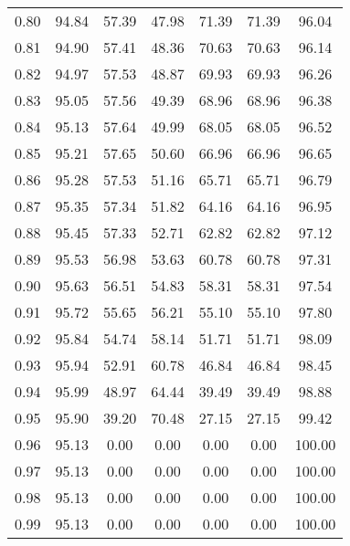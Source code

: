 \begin{tabular}{|c|c|c|c|c|c|c|}
      0.80 &     94.84 &     57.39 &      47.98 &   71.39 &      71.39 &         96.04 \\
      0.81 &     94.90 &     57.41 &      48.36 &   70.63 &      70.63 &         96.14 \\
      0.82 &     94.97 &     57.53 &      48.87 &   69.93 &      69.93 &         96.26 \\
      0.83 &     95.05 &     57.56 &      49.39 &   68.96 &      68.96 &         96.38 \\
      0.84 &     95.13 &     57.64 &      49.99 &   68.05 &      68.05 &         96.52 \\
      0.85 &     95.21 &     57.65 &      50.60 &   66.96 &      66.96 &         96.65 \\
      0.86 &     95.28 &     57.53 &      51.16 &   65.71 &      65.71 &         96.79 \\
      0.87 &     95.35 &     57.34 &      51.82 &   64.16 &      64.16 &         96.95 \\
      0.88 &     95.45 &     57.33 &      52.71 &   62.82 &      62.82 &         97.12 \\
      0.89 &     95.53 &     56.98 &      53.63 &   60.78 &      60.78 &         97.31 \\
      0.90 &     95.63 &     56.51 &      54.83 &   58.31 &      58.31 &         97.54 \\
      0.91 &     95.72 &     55.65 &      56.21 &   55.10 &      55.10 &         97.80 \\
      0.92 &     95.84 &     54.74 &      58.14 &   51.71 &      51.71 &         98.09 \\
      0.93 &     95.94 &     52.91 &      60.78 &   46.84 &      46.84 &         98.45 \\
      0.94 &     95.99 &     48.97 &      64.44 &   39.49 &      39.49 &         98.88 \\
      0.95 &     95.90 &     39.20 &      70.48 &   27.15 &      27.15 &         99.42 \\
      0.96 &     95.13 &      0.00 &       0.00 &    0.00 &       0.00 &        100.00 \\
      0.97 &     95.13 &      0.00 &       0.00 &    0.00 &       0.00 &        100.00 \\
      0.98 &     95.13 &      0.00 &       0.00 &    0.00 &       0.00 &        100.00 \\
      0.99 &     95.13 &      0.00 &       0.00 &    0.00 &       0.00 &        100.00 \\
\bottomrule
\end{tabular}
